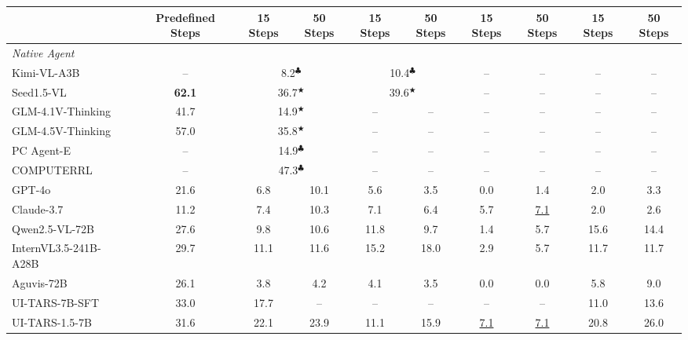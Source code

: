 \begin{table}[t]
{\begin{tabular}{@{}c l c cc cc cc cc @{}}
\multicolumn{2}{c}{} & \multicolumn{1}{c}{ {Predefined Steps}} &  15 Steps & 50 Steps &  15 Steps &  50 Steps &  15 Steps &  50 Steps &  15 Steps & 50 Steps \\
\midrule
\multicolumn{11}{l}{\textit{Native Agent}} \\ 
\midrule
\multicolumn{2}{l}{Kimi-VL-A3B~\citeyearpar{kimiteam2025kimivltechnicalreport}}  & -- &  \multicolumn{2}{c}{8.2$^\clubsuit$} & \multicolumn{2}{c}{10.4$^\clubsuit$} & -- & -- & -- & -- \\
\multicolumn{2}{l}{Seed1.5-VL~\citeyearpar{guo2025seed1}} & \textbf{62.1} & \multicolumn{2}{c}{36.7$^\bigstar$} & \multicolumn{2}{c}{39.6$^\bigstar$} & -- & -- & -- & -- \\
\multicolumn{2}{l}{GLM-4.1V-Thinking~\citeyearpar{hong2025glm}}  & 41.7 & \multicolumn{2}{c}{14.9$^\bigstar$} & -- & -- & -- & -- & -- & -- \\
\multicolumn{2}{l}{GLM-4.5V-Thinking~\citeyearpar{hong2025glm}}  & 57.0 & \multicolumn{2}{c}{35.8$^\bigstar$} & -- & -- & -- & -- & -- & -- \\
\multicolumn{2}{l}{PC Agent-E~\citeyearpar{he2025efficientagenttrainingcomputer}}   & -- & \multicolumn{2}{c}{14.9$^\clubsuit$} & -- & -- & -- & -- & -- & -- \\
\multicolumn{2}{l}{COMPUTERRL~\citeyearpar{lai2025computerrl}}   & -- & \multicolumn{2}{c}{47.3$^\clubsuit$} & -- & -- & -- & -- & -- & -- \\
\multicolumn{2}{l}{GPT-4o~\citeyearpar{hurst2024gpt}} & 21.6  & 6.8 & 10.1 & 5.6 & 3.5 & 0.0 & 1.4 & 2.0 & 3.3 \\
\multicolumn{2}{l}{Claude-3.7~\citeyearpar{anthropic2025claude37}}  & 11.2 & 7.4 & 10.3 & 7.1 & 6.4 & 5.7 & \underline{7.1} & 2.0 & 2.6 \\
\multicolumn{2}{l}{Qwen2.5-VL-72B~\citeyearpar{bai2025qwen25vl}}  & 27.6 & 9.8 & 10.6 & 11.8 & 9.7 & 1.4 & 5.7 & 15.6 & 14.4 \\
\multicolumn{2}{l}{InternVL3.5-241B-A28B~\citeyearpar{wang2025internvl35}}  & 29.7 & 11.1 & 11.6 & 15.2 & 18.0 & 2.9 & 5.7 & 11.7 & 11.7 \\
\multicolumn{2}{l}{Aguvis-72B~\citeyearpar{xu2024aguvis} }  & 26.1 & 3.8 & 4.2 & 4.1 & 3.5 & 0.0 & 0.0 & 5.8 & 9.0 \\
\multicolumn{2}{l}{UI-TARS-7B-SFT~\citeyearpar{qin2025uitars}}  & 33.0 & 17.7 & -- & -- & -- & -- & -- & 11.0 & 13.6 \\
\multicolumn{2}{l}{UI-TARS-1.5-7B~\citeyearpar{qin2025uitars} } & 31.6 & 22.1 & 23.9 & 11.1 & 15.9 & \underline{7.1} & \underline{7.1} & 20.8 & 26.0 \\

\end{tabular}}
\end{table}
